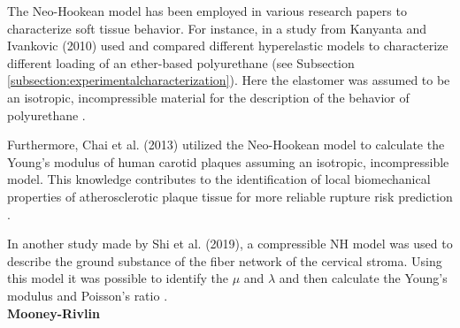 The Neo-Hookean model has been employed in various research papers to characterize soft tissue behavior. 
For instance, in a study from Kanyanta and Ivankovic (2010) used and compared different hyperelastic models to characterize different loading 
of an ether-based polyurethane (see Subsection \ref{subsection:experimentalcharacterization}). Here the elastomer was assumed to 
be an isotropic, incompressible material for the description of the behavior of polyurethane \cite{Kanyanta2010}.

Furthermore, Chai et al. (2013) utilized the Neo-Hookean model to calculate the Young's modulus of human carotid plaques
assuming an isotropic, incompressible model. This knowledge contributes to the identification of local biomechanical properties 
of atherosclerotic plaque tissue for more reliable rupture risk prediction \cite{Chai2013}.

In another study made by Shi et al. (2019), a compressible NH model was used to describe the ground substance of the 
fiber network of the cervical stroma. Using this model it was possible to identify the $\mu$ and $\lambda$ and then calculate the Young's modulus and 
Poisson's ratio \cite{Shi2019}.\\

\textbf{Mooney-Rivlin}\\

